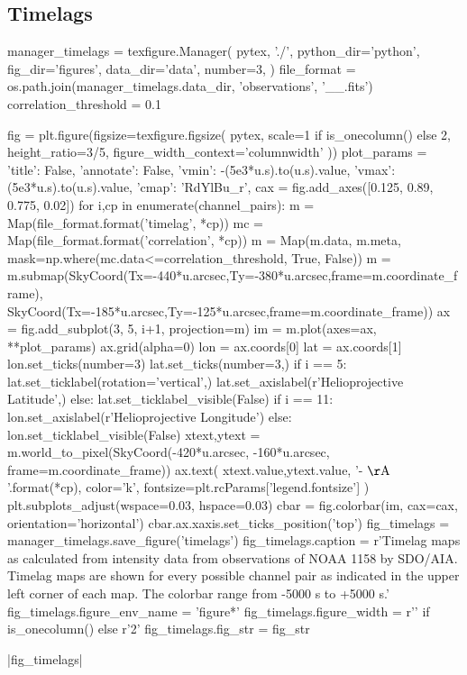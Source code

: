 \subsection{Timelags}\label{timelags}

\begin{pycode}
manager_timelags = texfigure.Manager(
    pytex, './',
    python_dir='python',
    fig_dir='figures',
    data_dir='data',
    number=3,
)
file_format = os.path.join(manager_timelags.data_dir, 'observations', '{}_{}_{}.fits')
correlation_threshold = 0.1
\end{pycode}

\begin{pycode}
fig = plt.figure(figsize=texfigure.figsize(
    pytex,
    scale=1 if is_onecolumn() else 2,
    height_ratio=3/5,
    figure_width_context='columnwidth'
))
plot_params = {
    'title': False, 
    'annotate': False,
    'vmin': -(5e3*u.s).to(u.s).value,
    'vmax': (5e3*u.s).to(u.s).value,
    'cmap': 'RdYlBu_r',
}
cax = fig.add_axes([0.125, 0.89, 0.775, 0.02])
for i,cp in enumerate(channel_pairs):
    m = Map(file_format.format('timelag', *cp))
    mc = Map(file_format.format('correlation', *cp))
    m = Map(m.data, m.meta, mask=np.where(mc.data<=correlation_threshold, True, False))
    m = m.submap(SkyCoord(Tx=-440*u.arcsec,Ty=-380*u.arcsec,frame=m.coordinate_frame),
                 SkyCoord(Tx=-185*u.arcsec,Ty=-125*u.arcsec,frame=m.coordinate_frame))
    ax = fig.add_subplot(3, 5, i+1, projection=m)
    im = m.plot(axes=ax, **plot_params)
    ax.grid(alpha=0)
    lon = ax.coords[0]
    lat = ax.coords[1]
    lon.set_ticks(number=3)
    lat.set_ticks(number=3,) 
    if i == 5:
        lat.set_ticklabel(rotation='vertical',)
        lat.set_axislabel(r'Helioprojective Latitude',)
    else:
        lat.set_ticklabel_visible(False)
    if i == 11:
        lon.set_axislabel(r'Helioprojective Longitude')
    else:
        lon.set_ticklabel_visible(False)
    xtext,ytext = m.world_to_pixel(SkyCoord(-420*u.arcsec, -160*u.arcsec, frame=m.coordinate_frame))
    ax.text(
        xtext.value,ytext.value,
        '{}-{} $\mathrm{{\AA}}$'.format(*cp),
        color='k',
        fontsize=plt.rcParams['legend.fontsize']
    )
plt.subplots_adjust(wspace=0.03, hspace=0.03)
cbar = fig.colorbar(im, cax=cax, orientation='horizontal')
cbar.ax.xaxis.set_ticks_position('top')
fig_timelags = manager_timelags.save_figure('timelags')
fig_timelags.caption = r'Timelag maps as calculated from intensity data from observations of \AR{} NOAA 1158 by SDO/AIA. Timelag maps are shown for every possible channel pair as indicated in the upper left corner of each map. The colorbar range from -5000 s to +5000 s.'
fig_timelags.figure_env_name = 'figure*'
fig_timelags.figure_width = r'\columnwidth' if is_onecolumn() else r'2\columnwidth'
fig_timelags.fig_str = fig_str
\end{pycode}
|fig_timelags|

